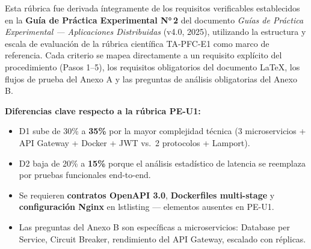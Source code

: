 \documentclass[11pt,a4paper,landscape]{article}
\begin{document}
	{\small\color{darktext}
		Esta r\'ubrica fue derivada \'integramente de los requisitos verificables establecidos en la \textbf{Gu\'ia de Pr\'actica Experimental N°\,2} del documento \textit{Gu\'ias de Pr\'actica Experimental --- Aplicaciones Distribuidas} (v4.0, 2025), utilizando la estructura y escala de evaluaci\'on de la r\'ubrica cient\'ifica TA-PFC-E1 como marco de referencia. Cada criterio se mapea directamente a un requisito expl\'icito del procedimiento (Pasos 1--5), los requisitos obligatorios del documento LaTeX, los flujos de prueba del Anexo A y las preguntas de an\'alisis obligatorias del Anexo B.
		
		\vspace{4pt}
		\textbf{Diferencias clave respecto a la r\'ubrica PE-U1:}
		\begin{itemize}[leftmargin=1.5em]
			\item D1 sube de 30\% a \textbf{35\%} por la mayor complejidad t\'ecnica (3 microservicios + API Gateway + Docker + JWT vs.\ 2 protocolos + Lamport).
			\item D2 baja de 20\% a \textbf{15\%} porque el an\'alisis estad\'istico de latencia se reemplaza por pruebas funcionales end-to-end.
			\item Se requieren \textbf{contratos OpenAPI 3.0}, \textbf{Dockerfiles multi-stage} y \textbf{configuraci\'on Nginx} en lstlisting --- elementos ausentes en PE-U1.
			\item Las preguntas del Anexo B son espec\'ificas a microservicios: Database per Service, Circuit Breaker, rendimiento del API Gateway, escalado con r\'eplicas.
		\end{itemize}
	}
	
\end{document}
